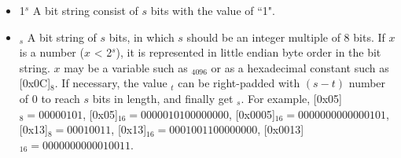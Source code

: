 \documentclass[main\_\_EN.tex]{subfiles}
\begin{document}
\begin{itemize}
\item 
1\begin{math}^s\end{math} 
\hspace{0.75cm} 
A bit string consist of \begin{math}s\end{math} bits with the value of ``1".

\item
    \begin{math}[x]_{s}\end{math}  \hspace{0.5cm}
       A bit string of \begin{math}s\end{math} bits, in which \begin{math}s\end{math} should be an integer multiple of 8 bits. If \begin{math}x\end{math} is a number (\begin{math}x\end{math} < 2\begin{math}^s\end{math}), it is represented in little endian byte order in the bit string. \begin{math}x\end{math} may be a variable such as \begin{math}[Y]_{4096}\end{math} or as a hexadecimal constant such as [0x0C]\begin{math}_{8}\end{math}. If necessary, the value \begin{math}[x]_{t}\end{math} can be right-padded with \begin{math} (s-t) \end{math} number of 0 to reach \begin{math}s\end{math} bits in length, and finally get \begin{math}[x]_{s}\end{math}. For example, [0x05]\begin{math}_{8} = 00000101\end{math}, 
       [0x05]\begin{math}_{16} = 00000101 00000000\end{math}, 
       [0x0005]\begin{math}_{16} = 00000000 00000101\end{math}, 
       [0x13]\begin{math}_{8} = 00010011\end{math}, 
       [0x13]\begin{math}_{16} = 00010011 00000000\end{math}, 
       [0x0013]\begin{math}_{16} = 00000000 00010011\end{math}.


\end{itemize}
\end{document}
